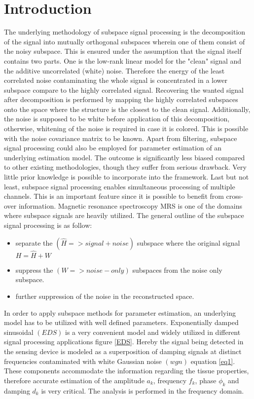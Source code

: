 \section{Introduction}

The underlying methodology of subspace signal processing is the decomposition of the signal into mutually orthogonal subspaces wherein one of them consist of the noisy subspace. This is ensured under the assumption that the signal itself contains two parts. One is the low-rank linear model for the "clean" signal and the additive uncorrelated (white) noise. Therefore the energy of the least correlated noise contaminating the whole signal is concentrated in a lower subspace compare to the highly correlated signal. Recovering the wanted signal after decomposition is performed by mapping the highly correlated subspaces onto the space where the structure is the closest to the clean signal. Additionally, the noise is supposed to be white before application of this decomposition, otherwise, whitening of the noise is required in case it is colored. This is possible with the noise covariance matrix to be known. Apart from filtering, subspace signal processing could also be employed for parameter estimation of an underlying estimation model. The outcome is significantly less biased compared to other existing methodologies, though they suffer from serious drawback. Very little prior knowledge is possible to incorporate into the framework. Last but not least, subspace signal processing enables simultaneous processing of multiple channels. This is an important feature since it is possible to benefit from cross-over information. Magnetic resonance spectroscopy MRS is one of the domains where subspace signals are heavily utilized. The general outline of the subspace signal processing is as follow:

\begin{itemize}
    \item separate the $(\hat{H}=>signal+noise)$  subspace where the original signal $H=\hat{H}+W$
    \item suppress the $(W=>noise-only)$ subspaces from the noise only subspace. 
    \item further suppression of the noise in the reconstructed space. 
\end{itemize}

In order to apply subspace methods for parameter estimation, an underlying model has to be utilized with well defined parameters. Exponentially damped sinusoidal $(EDS)$ is a very convenient model and widely utilized in different signal processing applications figure \ref{EDS}. Hereby the signal being detected in the sensing device is modeled as a superposition of damping signals at distinct frequencies contaminated with white Gaussian noise $(wgn)$ equation \ref{eq1}. These components accommodate the information regarding the tissue properties, therefore accurate estimation of the amplitude $a_{k}$, frequency $f_{k}$, phase $\phi_{k}$ and damping $d_{k}$ is very critical. The analysis is performed in the frequency domain.   

